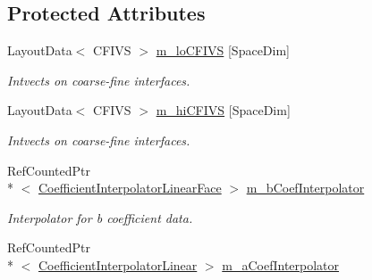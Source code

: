 \subsection*{Protected Attributes}
\begin{DoxyCompactItemize}
\item 
\hypertarget{class_a_m_r_non_linear_v_c_op_a3c546833333954c5165a66cfc0605209}{Layout\-Data$<$ C\-F\-I\-V\-S $>$ \hyperlink{class_a_m_r_non_linear_v_c_op_a3c546833333954c5165a66cfc0605209}{m\-\_\-lo\-C\-F\-I\-V\-S} \mbox{[}Space\-Dim\mbox{]}}\label{class_a_m_r_non_linear_v_c_op_a3c546833333954c5165a66cfc0605209}

\begin{DoxyCompactList}\small\item\em Intvects on coarse-\/fine interfaces. \end{DoxyCompactList}\item 
\hypertarget{class_a_m_r_non_linear_v_c_op_a74dc9950a5472215007a08f458953bdc}{Layout\-Data$<$ C\-F\-I\-V\-S $>$ \hyperlink{class_a_m_r_non_linear_v_c_op_a74dc9950a5472215007a08f458953bdc}{m\-\_\-hi\-C\-F\-I\-V\-S} \mbox{[}Space\-Dim\mbox{]}}\label{class_a_m_r_non_linear_v_c_op_a74dc9950a5472215007a08f458953bdc}

\begin{DoxyCompactList}\small\item\em Intvects on coarse-\/fine interfaces. \end{DoxyCompactList}\item 
\hypertarget{class_a_m_r_non_linear_v_c_op_a554b708171f46343306385bb23bd23c4}{Ref\-Counted\-Ptr\\*
$<$ \hyperlink{class_coefficient_interpolator_linear_face}{Coefficient\-Interpolator\-Linear\-Face} $>$ \hyperlink{class_a_m_r_non_linear_v_c_op_a554b708171f46343306385bb23bd23c4}{m\-\_\-b\-Coef\-Interpolator}}\label{class_a_m_r_non_linear_v_c_op_a554b708171f46343306385bb23bd23c4}

\begin{DoxyCompactList}\small\item\em Interpolator for b coefficient data. \end{DoxyCompactList}\item 
\hypertarget{class_a_m_r_non_linear_v_c_op_a8d3b1b177ad5517b1c5fe89332318dfc}{Ref\-Counted\-Ptr\\*
$<$ \hyperlink{class_coefficient_interpolator_linear}{Coefficient\-Interpolator\-Linear} $>$ \hyperlink{class_a_m_r_non_linear_v_c_op_a8d3b1b177ad5517b1c5fe89332318dfc}{m\-\_\-a\-Coef\-Interpolator}}\label{class_a_m_r_non_linear_v_c_op_a8d3b1b177ad5517b1c5fe89332318dfc}


\end{DoxyCompactItemize}
